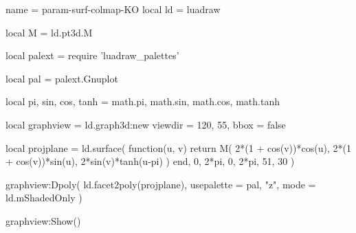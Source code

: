 \documentclass[border = 3pt]{standalone}
\begin{document}
\begin{luadraw*}{name = param-surf-colmap-KO}
local ld = luadraw

local M = ld.pt3d.M

local palext = require 'luadraw_palettes'

local pal = palext.Gnuplot

local pi, sin, cos, tanh = math.pi, math.sin, math.cos, math.tanh

local graphview = ld.graph3d:new{
  viewdir = {120, 55},
  bbox    = false
}

local projplane = ld.surface(
  function(u, v)
    return M(
      2*(1 + cos(v))*cos(u),
      2*(1 + cos(v))*sin(u),
      2*sin(v)*tanh(u-pi)
    )
  end,
  0, 2*pi, 0,  2*pi,
  {51, 30}
)

graphview:Dpoly(
  ld.facet2poly(projplane),
  {
    usepalette = {pal, "z"},
    mode       = ld.mShadedOnly
  }
)

graphview:Show()
\end{luadraw*}
\end{document}
